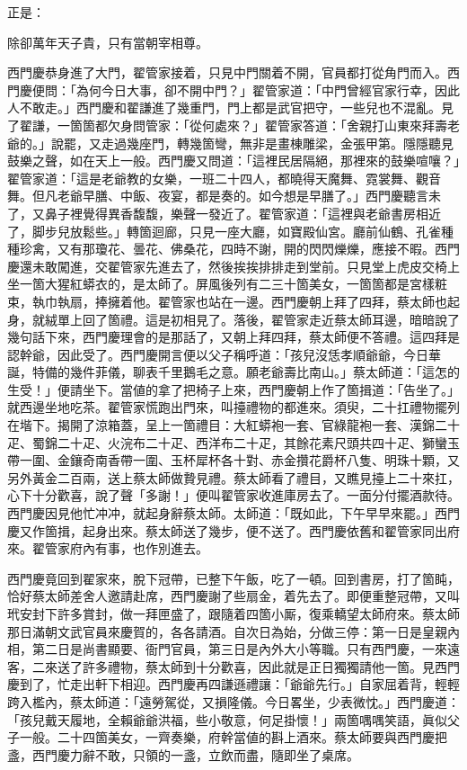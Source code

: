 正是：

\begin{myquote}
除卻萬年天子貴，只有當朝宰相尊。
\end{myquote}

西門慶恭身進了大門，翟管家接着，只見中門關着不開，{}官員都打從角門而入。西門慶便問：「為何今日大事，卻不開中門？」翟管家道：「中門曾經官家行幸，因此人不敢走。」西門慶和翟謙進了幾重門，門上都是武官把守，一些兒也不混亂。見了翟謙，一箇箇都欠身問管家：「從何處來？」翟管家答道：「舍親打山東來拜壽老爺的。」說罷，又走過幾座門，轉幾箇彎，無非是畫棟雕梁，金張甲第。隱隱聽見鼓樂之聲，如在天上一般。西門慶又問道：「這裡民居隔絕，那裡來的鼓樂喧嚷？」翟管家道：「這是老爺教的女樂，一班二十四人，都曉得天魔舞、霓裳舞、觀音舞。但凡老爺早膳、中飯、夜宴，都是奏的。如今想是早膳了。」{}西門慶聽言未了，又鼻子裡覺得異香馥馥，樂聲一發近了。翟管家道：「這裡與老爺書房相近了，脚步兒放鬆些。」轉箇迴廊，只見一座大廳，如寶殿仙宮。廳前仙鶴、孔雀種種珍禽，又有那瓊花、曇花、佛桑花，四時不謝，開的閃閃爍爍，應接不暇。西門慶還未敢闖進，交翟管家先進去了，然後挨挨排排走到堂前。只見堂上虎皮交椅上坐一箇大猩紅蟒衣的，是太師了。屏風後列有二三十箇美女，一箇箇都是宮樣粧束，執巾執扇，捧擁着他。翟管家也站在一邊。西門慶朝上拜了四拜，蔡太師也起身，就絨單上回了箇禮。這是初相見了。落後，翟管家走近蔡太師耳邊，暗暗說了幾句話下來，西門慶理會的是那話了，又朝上拜四拜，蔡太師便不答禮。這四拜是認幹爺，因此受了。{}西門慶開言便以父子稱呼道：「孩兒沒恁孝順爺爺，今日華誕，特備的幾件菲儀，聊表千里鵝毛之意。願老爺壽比南山。」蔡太師道：「這怎的生受！」便請坐下。當値的拿了把椅子上來，西門慶朝上作了箇揖道：「告坐了。」就西邊坐地吃茶。翟管家慌跑出門來，叫擡禮物的都進來。須臾，二十扛禮物擺列在堦下。揭開了涼箱蓋，呈上一箇禮目：大紅蟒袍一套、官綠龍袍一套、漢錦二十疋、蜀錦二十疋、火浣布二十疋、西洋布二十疋，其餘花素尺頭共四十疋、獅蠻玉帶一圍、金鑲奇南香帶一圍、玉杯犀杯各十對、赤金攢花爵杯八隻、明珠十顆，又另外黃金二百兩，送上蔡太師做贄見禮。蔡太師看了禮目，又瞧見擡上二十來扛，心下十分歡喜，說了聲「多謝！」便叫翟管家收進庫房去了。一面分付擺酒款待。西門慶因見他忙冲冲，就起身辭蔡太師。太師道：「既如此，下午早早來罷。」西門慶又作箇揖，起身出來。蔡太師送了幾步，便不送了。{}西門慶依舊和翟管家同出府來。翟管家府內有事，也作別進去。

西門慶竟回到翟家來，脫下冠帶，已整下午飯，吃了一頓。回到書房，打了箇盹，恰好蔡太師差舍人邀請赴席，西門慶謝了些扇金，着先去了。即便重整冠帶，又叫玳安封下許多賞封，做一拜匣盛了，跟隨着四箇小厮，復乘轎望太師府來。蔡太師那日滿朝文武官員來慶賀的，各各請酒。自次日為始，分做三停：第一日是皇親內相，第二日是尚書顯要、衙門官員，第三日是內外大小等職。只有西門慶，一來遠客，二來送了許多禮物，蔡太師到十分歡喜，因此就是正日獨獨請他一箇。見西門慶到了，忙走出軒下相迎。西門慶再四謙遜禮讓：「爺爺先行。」自家屈着背，輕輕跨入檻內，蔡太師道：「遠勞駕從，又損隆儀。今日畧坐，少表微忱。」西門慶道：「孩兒戴天履地，全賴爺爺洪福，些小敬意，何足掛懷！」兩箇喁喁笑語，眞似父子一般。{}二十四箇美女，一齊奏樂，府幹當値的斟上酒來。蔡太師要與西門慶把盞，西門慶力辭不敢，只領的一盞，立飲而盡，隨即坐了桌席。

